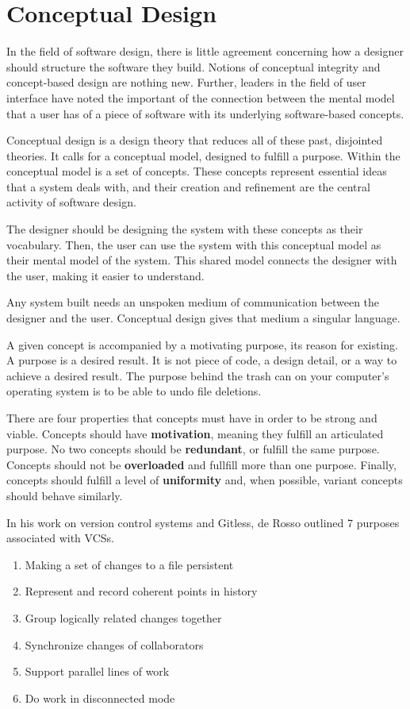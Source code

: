 \section{Conceptual Design}

In the field of software design, there is little agreement concerning how a designer should structure the software they build. Notions of conceptual integrity and concept-based design are nothing new. Further, leaders in the field of user interface have noted the important of the connection between the mental model that a user has of a piece of software with its underlying software-based concepts. 

Conceptual design is a design theory that reduces all of these past, disjointed theories. It calls for a conceptual model, designed to fulfill a purpose. Within the conceptual model is a set of concepts. These concepts represent essential ideas that a system deals with, and their creation and refinement are the central activity of software design.

The designer should be designing the system with these concepts as their vocabulary. Then, the user can use the system with this conceptual model as their mental model of the system. This shared model connects the designer with the user, making it easier to understand.

Any system built needs an unspoken medium of communication between the designer and the user. Conceptual design gives that medium a singular language.

A given concept is accompanied by a motivating purpose, its reason for existing. A purpose is a desired result. It is not piece of code, a design detail, or a way to achieve a desired result. The purpose behind the trash can on your computer's operating system is to be able to undo file deletions.

There are four properties that concepts must have in order to be strong and viable. Concepts should have \textbf{motivation}, meaning they fulfill an articulated purpose. No two concepts should be \textbf{redundant}, or fulfill the same purpose. Concepts should not be \textbf{overloaded} and fullfill more than one purpose. Finally, concepts should fulfill a level of \textbf{uniformity} and, when possible, variant concepts should behave similarly.

In his work on version control systems and Gitless, de Rosso outlined 7 purposes associated with VCSs.\begin{enumerate}
  \item{Making a set of changes to a file persistent}
  \item{Represent and record coherent points in history}
  \item{Group logically related changes together}
  \item{Synchronize changes of collaborators}
  \item{Support parallel lines of work}
  \item{Do work in disconnected mode}
\end{enumerate}

